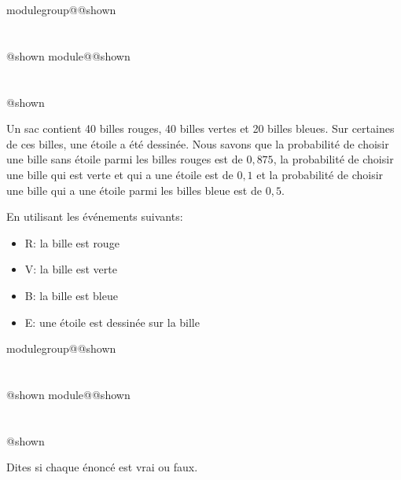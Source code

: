 \documentclass{Evaluation}
\makeatletter
\newcommand{\currentmodulekey}{}
\newcommand{\currentmoduletitle}{}
\newcommand{\currentgroupkey}{}
\newcommand{\currentgrouptitle}{}
\newcommand{\showmoduleifneeded}{%
  \ifx\currentgroupkey\empty\else
    \expandafter\ifx\csname modulegroup@\currentgroupkey @shown\endcsname\relax
      \section*{\currentgrouptitle}%
      \expandafter\gdef\csname modulegroup@\currentgroupkey @shown\endcsname{1}%
    \fi
  \fi
  \expandafter\ifx\csname module@\currentmodulekey @shown\endcsname\relax
    \section*{\currentmoduletitle}%
    \expandafter\gdef\csname module@\currentmodulekey @shown\endcsname{1}%
  \fi
}
\newenvironment{H25}{\showmoduleifneeded}{}
\newenvironment{H26r}{\showmoduleifneeded}{}
\makeatother
\begin{document}
\begin{questions}
\begin{H25}
Un sac contient 40 billes rouges, 40 billes vertes et 20 billes bleues.
Sur certaines de ces billes, une étoile a été dessinée.
Nous savons que la probabilité de choisir une bille sans étoile parmi les billes rouges est de $0,875$, la probabilité de choisir une bille qui est verte et qui a une étoile est de $0,1$ et la probabilité de choisir une bille qui a une étoile parmi les billes bleue est de $0,5$.

En utilisant les événements suivants:

\begin{itemize}
    \item R: la bille est rouge
    \item V: la bille est verte
    \item B: la bille est bleue
    \item E: une étoile est dessinée sur la bille
\end{itemize}

\end{H25}

\begin{H26r}
\question {} %
Dites si chaque énoncé est vrai ou faux.

\end{H26r}
\end{questions}
\end{document}
